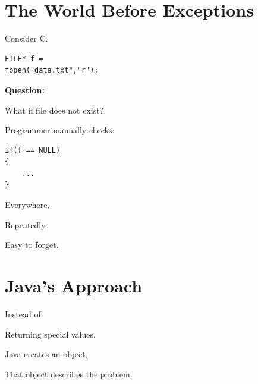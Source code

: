 \documentclass[11pt,a4paper]{book}
\begin{document}

\section{The World Before Exceptions}

Consider C.

\begin{verbatim} 
FILE* f =
fopen("data.txt","r");
\end{verbatim}


\textbf{Question:}

What if file does not exist?


Programmer manually checks:

\begin{verbatim} 
if(f == NULL)
{
    ...
}
\end{verbatim}


Everywhere.


Repeatedly.


Easy to forget.


\section{Java's Approach}

Instead of:


Returning special values.


Java creates an object.


That object describes the problem.

\end{document}
